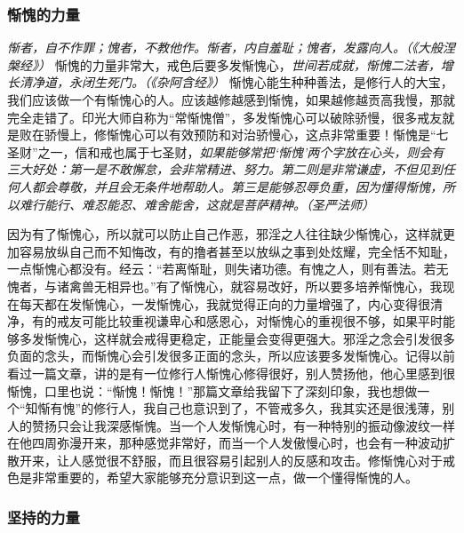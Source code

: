 \subsubsection{惭愧的力量}

\textit{惭者，自不作罪；愧者，不教他作。惭者，内自羞耻；愧者，发露向人。（《大般涅槃经》）} 惭愧的力量非常大，戒色后要多发惭愧心，\textit{世间若成就，惭愧二法者，增长清净道，永闭生死门。（《杂阿含经》）} 惭愧心能生种种善法，是修行人的大宝，我们应该做一个有惭愧心的人。应该越修越感到惭愧，如果越修越贡高我慢，那就完全走错了。印光大师自称为“常惭愧僧”，多发惭愧心可以破除骄慢，很多戒友就是败在骄慢上，修惭愧心可以有效预防和对治骄慢心，这点非常重要！惭愧是“七圣财”之一，信和戒也属于七圣财，\textit{如果能够常把‘惭愧’两个字放在心头，则会有三大好处：第一是不敢懈怠，会非常精进、努力。第二则是非常谦虚，不但见到任何人都会尊敬，并且会无条件地帮助人。第三是能够忍辱负重，因为懂得惭愧，所以难行能行、难忍能忍、难舍能舍，这就是菩萨精神。（圣严法师）}

因为有了惭愧心，所以就可以防止自己作恶，邪淫之人往往缺少惭愧心，这样就更加容易放纵自己而不知悔改，有的撸者甚至以放纵之事到处炫耀，完全恬不知耻，一点惭愧心都没有。经云：“若离惭耻，则失诸功德。有愧之人，则有善法。若无愧者，与诸禽兽无相异也。”有了惭愧心，就容易改好，所以要多培养惭愧心，我现在每天都在发惭愧心，一发惭愧心，我就觉得正向的力量增强了，内心变得很清净，有的戒友可能比较重视谦卑心和感恩心，对惭愧心的重视很不够，如果平时能够多发惭愧心，这样就会戒得更稳定，正能量会变得更强大。邪淫之念会引发很多负面的念头，而惭愧心会引发很多正面的念头，所以应该要多发惭愧心。记得以前看过一篇文章，讲的是有一位修行人惭愧心修得很好，别人赞扬他，他心里感到很惭愧，口里也说：“惭愧！惭愧！”那篇文章给我留下了深刻印象，我也想做一个“知惭有愧”的修行人，我自己也意识到了，不管戒多久，我其实还是很浅薄，别人的赞扬只会让我深感惭愧。当一个人发惭愧心时，有一种特别的振动像波纹一样在他四周弥漫开来，那种感觉非常好，而当一个人发傲慢心时，也会有一种波动扩散开来，让人感觉很不舒服，而且很容易引起别人的反感和攻击。修惭愧心对于戒色是非常重要的，希望大家能够充分意识到这一点，做一个懂得惭愧的人。

\subsubsection{坚持的力量}


